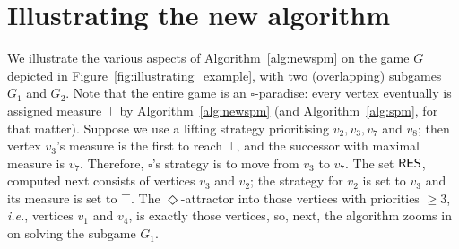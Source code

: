 \documentclass{eptcs}
\newcommand{\odd}{\ensuremath{\square}\xspace}
\newcommand{\even}{\ensuremath{\Diamond}\xspace}
\newcommand{\ie}{\emph{i.e.}\xspace}
\begin{document}
\section{Illustrating the new algorithm}
We illustrate the various aspects of Algorithm~\ref{alg:newspm} on
the game $G$ depicted in Figure~\ref{fig:illustrating_example}, with two (overlapping) subgames
$G_1$ and $G_2$.
Note that the entire game is an $\odd$-paradise: every vertex
eventually is assigned measure $\top$ by Algorithm~\ref{alg:newspm}
(and Algorithm~\ref{alg:spm}, for that matter). Suppose we use a
lifting strategy prioritising $v_2,v_3,v_7$ and $v_8$; then vertex
$v_3$'s measure is the first to reach $\top$, and the successor
with maximal measure is $v_7$. Therefore, $\odd$'s strategy is to
move from $v_3$ to $v_7$.  The set $\textsf{RES}$, computed next consists of
vertices $v_3$ and $v_2$; the strategy for $v_2$ is set to $v_3$
and its measure is set to $\top$. The $\even$-attractor into those
vertices with priorities $\ge 3$, \ie, vertices
$v_1$ and $v_4$, is exactly those vertices, so, next, the algorithm
zooms in on solving the subgame $G_1$.
\end{document}
